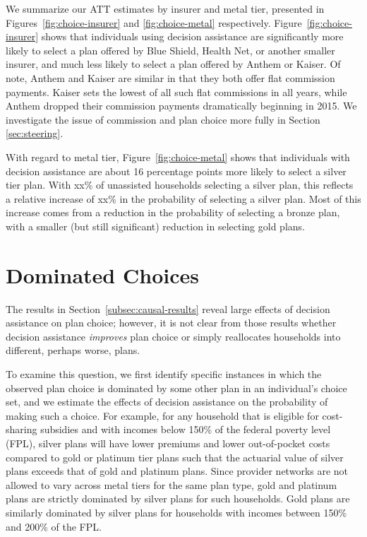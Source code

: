 \documentclass[12pt]{article}
\begin{document}
We summarize our ATT estimates by insurer and metal tier, presented in Figures~\ref{fig:choice-insurer} and \ref{fig:choice-metal} respectively. Figure~\ref{fig:choice-insurer} shows that individuals using decision assistance are significantly more likely to select a plan offered by Blue Shield, Health Net, or another smaller insurer, and much less likely to select a plan offered by Anthem or Kaiser. Of note, Anthem and Kaiser are similar in that they both offer flat commission payments. Kaiser sets the lowest of all such flat commissions in all years, while Anthem dropped their commission payments dramatically beginning in 2015. We investigate the issue of commission and plan choice more fully in Section \ref{sec:steering}.

With regard to metal tier, Figure~\ref{fig:choice-metal} shows that individuals with decision assistance are about 16 percentage points more likely to select a silver tier plan. With xx\% of unassisted households selecting a silver plan, this reflects a relative increase of xx\% in the probability of selecting a silver plan. Most of this increase comes from a reduction in the probability of selecting a bronze plan, with a smaller (but still significant) reduction in selecting gold plans.


\section{Dominated Choices}
\label{sec:dominated}
The results in Section~\ref{subsec:causal-results} reveal large effects of decision assistance on plan choice; however, it is not clear from those results whether decision assistance \textit{improves} plan choice or simply reallocates households into different, perhaps worse, plans. 

To examine this question, we first identify specific instances in which the observed plan choice is dominated by some other plan in an individual's choice set, and we estimate the effects of decision assistance on the probability of making such a choice. For example, for any household that is eligible for cost-sharing subsidies and with incomes below 150\% of the federal poverty level (FPL), silver plans will have lower premiums and lower out-of-pocket costs compared to gold or platinum tier plans such that the actuarial value of silver plans exceeds that of gold and platinum plans. Since provider networks are not allowed to vary across metal tiers for the same plan type, gold and platinum plans are strictly dominated by silver plans for such households. Gold plans are similarly dominated by silver plans for households with incomes between 150\% and 200\% of the FPL. 
\end{document}
